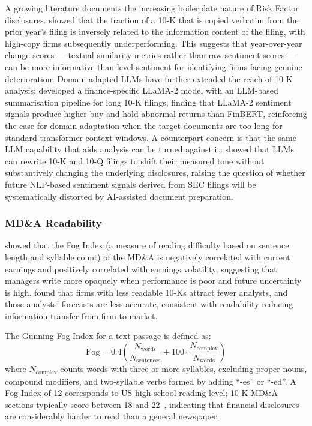 A growing literature documents the increasing boilerplate nature of Risk Factor disclosures. \citet{cohen2020lazy} showed that the fraction of a 10-K that is copied verbatim from the prior year's filing is inversely related to the information content of the filing, with high-copy firms subsequently underperforming. This suggests that year-over-year change scores --- textual similarity metrics rather than raw sentiment scores --- can be more informative than level sentiment for identifying firms facing genuine deterioration. Domain-adapted LLMs have further extended the reach of 10-K analysis: \citet{ChiuHung2024} developed a finance-specific LLaMA-2 model with an LLM-based summarisation pipeline for long 10-K filings, finding that LLaMA-2 sentiment signals produce higher buy-and-hold abnormal returns than FinBERT, reinforcing the case for domain adaptation when the target documents are too long for standard transformer context windows. A counterpart concern is that the same LLM capability that aids analysis can be turned against it: \citet{Lehner2024} showed that LLMs can rewrite 10-K and 10-Q filings to shift their measured tone without substantively changing the underlying disclosures, raising the question of whether future NLP-based sentiment signals derived from SEC filings will be systematically distorted by AI-assisted document preparation.

\subsubsection*{MD\&A Readability}

\citet{li2008annual} showed that the Fog Index (a measure of reading difficulty based on sentence length and syllable count) of the MD\&A is negatively correlated with current earnings and positively correlated with earnings volatility, suggesting that managers write more opaquely when performance is poor and future uncertainty is high. \citet{lehavy2011benefit} found that firms with less readable 10-Ks attract fewer analysts, and those analysts' forecasts are less accurate, consistent with readability reducing information transfer from firm to market.

\begin{definition}
\label{def:fog-index}
The Gunning Fog Index for a text passage is defined as:
\begin{equation}
  \label{eq:fog-index}
  \text{Fog} = 0.4 \left( \frac{N_{\text{words}}}{N_{\text{sentences}}} + 100 \cdot \frac{N_{\text{complex}}}{N_{\text{words}}} \right)
\end{equation}
where $N_{\text{complex}}$ counts words with three or more syllables, excluding proper nouns, compound modifiers, and two-syllable verbs formed by adding ``-es'' or ``-ed''. A Fog Index of 12 corresponds to US high-school reading level; 10-K MD\&A sections typically score between 18 and 22~\citep{li2008annual}, indicating that financial disclosures are considerably harder to read than a general newspaper.
\end{definition}

